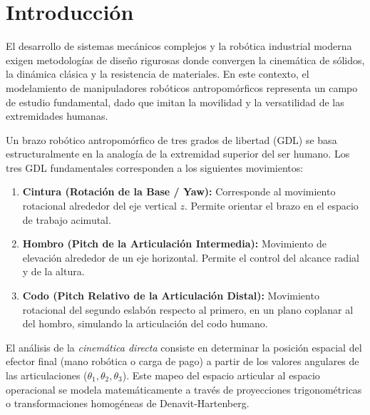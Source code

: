 \documentclass[11pt,a4paper]{article}
\begin{document}
\newpage
\tableofcontents
\newpage

\section{Introducción}
El desarrollo de sistemas mecánicos complejos y la robótica industrial moderna exigen metodologías de diseño rigurosas donde convergen la cinemática de sólidos, la dinámica clásica y la resistencia de materiales. En este contexto, el modelamiento de manipuladores robóticos antropomórficos representa un campo de estudio fundamental, dado que imitan la movilidad y la versatilidad de las extremidades humanas. 

Un brazo robótico antropomórfico de tres grados de libertad (GDL) se basa estructuralmente en la analogía de la extremidad superior del ser humano. Los tres GDL fundamentales corresponden a los siguientes movimientos:
\begin{enumerate}
    \item \textbf{Cintura (Rotación de la Base / Yaw):} Corresponde al movimiento rotacional alrededor del eje vertical $z$. Permite orientar el brazo en el espacio de trabajo acimutal.
    \item \textbf{Hombro (Pitch de la Articulación Intermedia):} Movimiento de elevación alrededor de un eje horizontal. Permite el control del alcance radial y de la altura.
    \item \textbf{Codo (Pitch Relativo de la Articulación Distal):} Movimiento rotacional del segundo eslabón respecto al primero, en un plano coplanar al del hombro, simulando la articulación del codo humano.
\end{enumerate}

El análisis de la \textit{cinemática directa} consiste en determinar la posición espacial del efector final (mano robótica o carga de pago) a partir de los valores angulares de las articulaciones ($\theta_1, \theta_2, \theta_3$). Este mapeo del espacio articular al espacio operacional se modela matemáticamente a través de proyecciones trigonométricas o transformaciones homogéneas de Denavit-Hartenberg.
\end{document}
